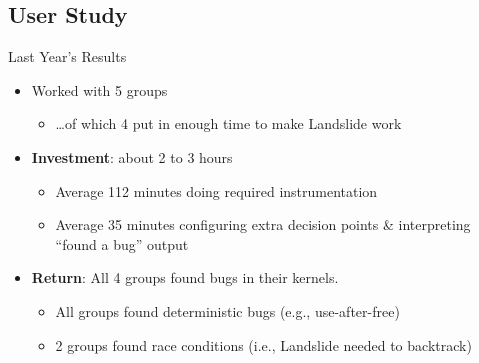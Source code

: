 \documentclass[xcolor=dvipsnames]{beamer}
\begin{document}
{%

\subsection{User Study}

\begin{frame}{Last Year's Results}
	\begin{itemize}
		\item Worked with 5 groups
		\begin{itemize}
			\item \dots{}of which 4 put in enough time to make Landslide work
		\end{itemize}
		\linegap
		\item {\bf Investment}: about 2 to 3 hours
		\begin{itemize}
			\item Average 112 minutes doing required instrumentation
			\item Average 35 minutes configuring extra decision points \& interpreting ``found a bug'' output
		\end{itemize}
		\pause
		\linegap
		\item {\bf Return}: All 4 groups found bugs in their kernels.
		\begin{itemize}
			\item All groups found deterministic bugs (e.g., use-after-free)
			\item 2 groups found race conditions (i.e., Landslide needed to backtrack)
		\end{itemize}
	\end{itemize}
\end{frame}

}
\end{document}
